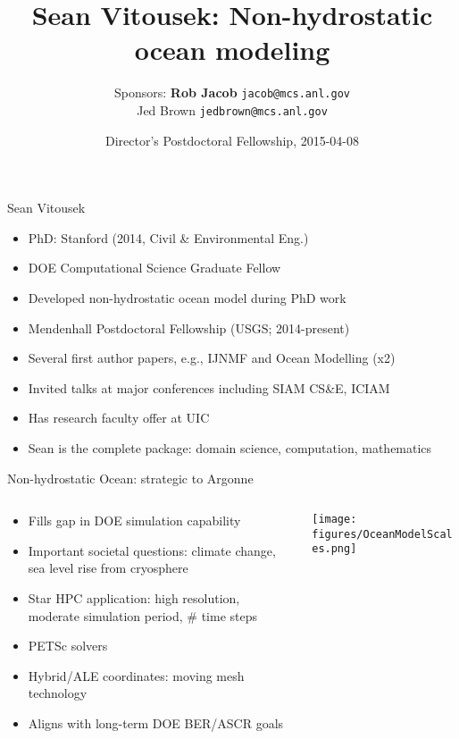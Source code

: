 \documentclass{beamer}
\title{Sean Vitousek: Non-hydrostatic ocean modeling}
\author{Sponsors: {\bf Rob Jacob} \texttt{jacob@mcs.anl.gov} \\
  \qquad Jed Brown \texttt{jedbrown@mcs.anl.gov}}
\date{Director's Postdoctoral Fellowship, 2015-04-08}
\begin{document}
\lstset{language=C}
\normalem

\begin{frame}
  \titlepage
\end{frame}

\begin{frame}{Sean Vitousek}
  \begin{itemize}
  \item PhD: Stanford (2014, Civil \& Environmental Eng.)
  \item DOE Computational Science Graduate Fellow
  \item Developed non-hydrostatic ocean model during PhD work
  \item Mendenhall Postdoctoral Fellowship (USGS; 2014-present)
  \item Several first author papers, e.g., IJNMF and Ocean Modelling (x2)
  \item Invited talks at major conferences including SIAM CS\&E, ICIAM
  \item Has research faculty offer at UIC
  \item Sean is the complete package: domain science, computation, mathematics
  \end{itemize}
\end{frame}

\begin{frame}{Non-hydrostatic Ocean: strategic to Argonne}
  \begin{columns}
    \begin{column}{0.42\textwidth}
      \begin{itemize}
      \item Fills gap in DOE simulation capability
      \item Important societal questions: climate change, sea level rise from cryosphere
      \item Star HPC application: high resolution, moderate simulation period, \# time steps
      \item PETSc solvers
      \item Hybrid/ALE coordinates: moving mesh technology
      \item Aligns with long-term DOE BER/ASCR goals
      \end{itemize}
    \end{column}
    \begin{column}{0.58\textwidth}
      \begin{center}
        \texttt{[image: figures/OceanModelScales.png]}
      \end{center}
    \end{column}
  \end{columns}
\end{frame}
\end{document}
